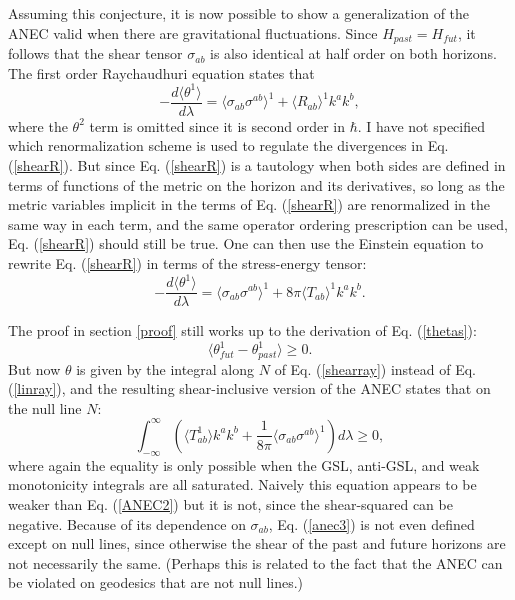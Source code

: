\documentclass{article}
\begin{document}
Assuming this conjecture, it is now possible to show a generalization of the ANEC valid when there are gravitational fluctuations.  Since $H_{past} = H_{fut}$, it follows that the shear tensor $\sigma_{ab}$ is also identical at half order on both horizons.  The first order Raychaudhuri equation states that
\begin{equation}\label{shearR}
-\frac{d \langle \theta^{1} \rangle}{d\lambda} = 
\langle \sigma_{ab}\sigma^{ab} \rangle^{1}
+ \langle R_{ab} \rangle^{1} k^a k^b,
\end{equation}
where the $\theta^2$ term is omitted since it is second order in $\hbar$.  I have not specified which renormalization scheme is used to regulate the divergences in Eq. (\ref{shearR}).  But since Eq. (\ref{shearR}) is a tautology when both sides are defined in terms of functions of the metric on the horizon and its derivatives, so long as the metric variables implicit in the terms of Eq. (\ref{shearR}) are renormalized in the same way in each term, and the same operator ordering prescription can be used, Eq. (\ref{shearR}) should still be true.  One can then use the Einstein equation to rewrite Eq. (\ref{shearR}) in terms of the stress-energy tensor:
\begin{equation}\label{shearray}
-\frac{d \langle \theta^{1} \rangle}{d\lambda} = 
\langle \sigma_{ab}\sigma^{ab} \rangle^{1}
+ 8\pi \langle T_{ab} \rangle^{1} k^a k^b.
\end{equation}

The proof in section \ref{proof} still works up to the derivation of Eq. (\ref{thetas}):
\begin{equation}
\langle \theta^{1}_{fut} - \theta^{1}_{past} \rangle \ge 0.
\end{equation}
But now $\theta$ is given by the integral along $N$ of Eq. (\ref{shearray}) instead of Eq. (\ref{linray}), and the resulting shear-inclusive version of the ANEC states that on the null line $N$:
\begin{equation}\label{anec3}
\int^{\infty}_{-\infty} (\langle T_{ab}^{1} \rangle k^a k^b + 
\frac{1}{8\pi} \langle \sigma_{ab}\sigma^{ab} \rangle^{1}) d\lambda \ge 0,
\end{equation}
where again the equality is only possible when the GSL, anti-GSL, and weak monotonicity integrals are all saturated.  Naively this equation appears to be weaker than Eq. (\ref{ANEC2}) but it is not, since the shear-squared can be negative.   Because of its dependence on $\sigma_{ab}$, Eq. (\ref{anec3}) is not even defined except on null lines, since otherwise the shear of the past and future horizons are not necessarily the same.  (Perhaps this is related to the fact that the ANEC can be violated on geodesics that are not null lines.)
\end{document}
